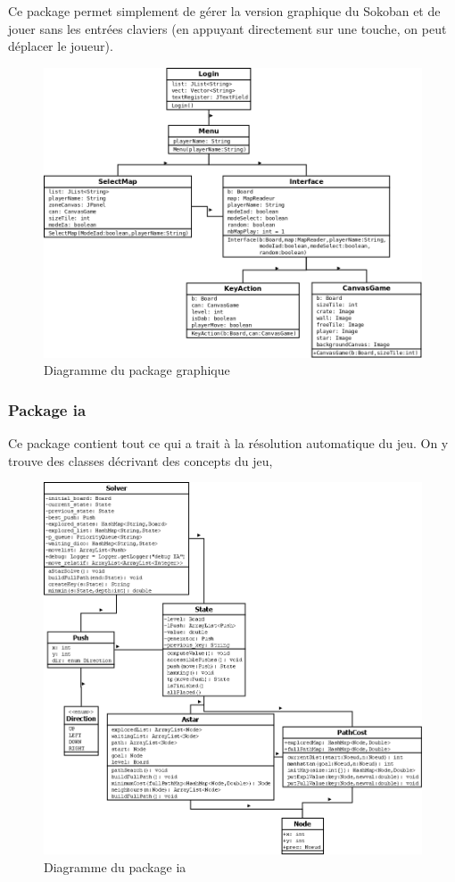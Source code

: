 \documentclass[a4paper,12pt]{article} %
\begin{document}
Ce package permet simplement de gérer la version graphique du Sokoban et de jouer sans les entrées claviers (en appuyant directement sur une touche, on peut déplacer le joueur).

\begin{figure}[!h]
\centering
\includegraphics[scale=0.4]{images/graphique.png}
\caption{Diagramme du package graphique}
\end{figure}

\subsubsection{Package ia}

Ce package contient tout ce qui a trait à la résolution automatique du jeu. On y trouve des classes décrivant des concepts du jeu, 

\begin{figure}[!h]
\centering
\includegraphics[scale=0.3]{images/diag_ia.png}
\caption{Diagramme du package ia}
\end{figure}
\end{document}
